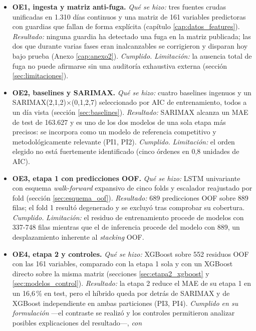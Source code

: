 \begin{itemize}
  \item \textbf{OE1, ingesta y matriz anti-fuga.} \emph{Qué se hizo:} tres fuentes crudas
    unificadas en 1.310 días continuos y una matriz de 161 variables predictoras con
    guardias que fallan de forma explícita (capítulo \ref{cap:datos_features}).
    \emph{Resultado:} ninguna guardia ha detectado una fuga en la matriz publicada; las
    dos que durante varias fases eran inalcanzables se corrigieron y disparan hoy bajo
    prueba (Anexo \ref{cap:anexo2}). \emph{Cumplido.} \emph{Limitación:} la ausencia
    total de fuga no puede afirmarse sin una auditoría exhaustiva externa (sección
    \ref{sec:limitaciones}).
  \item \textbf{OE2, baselines y SARIMAX.} \emph{Qué se hizo:} cuatro baselines ingenuos y
    un SARIMAX(2,1,2)$\times$(0,1,2,7) seleccionado por AIC de entrenamiento, todos a un
    día vista (sección \ref{sec:baselines}). \emph{Resultado:} SARIMAX alcanza un MAE de
    test de 163.627 y es uno de los dos modelos de una sola etapa más precisos: se
    incorpora como un modelo de referencia competitivo y metodológicamente relevante
    (PI1, PI2). \emph{Cumplido.} \emph{Limitación:}
    el orden elegido no está fuertemente identificado (cinco órdenes en 0,8 unidades de
    AIC).
  \item \textbf{OE3, etapa 1 con predicciones OOF.} \emph{Qué se hizo:} LSTM univariante
    con esquema \emph{walk-forward} expansivo de cinco folds y escalador reajustado por fold
    (sección \ref{sec:esquema_oof}). \emph{Resultado:} 689 predicciones OOF sobre 889 filas;
    el fold 1 resultó degenerado y se excluyó tras comprobar su cobertura.
    \emph{Cumplido.} \emph{Limitación:} el residuo de entrenamiento procede de modelos con
    337-748 filas mientras que el de inferencia procede del modelo con 889, un
    desplazamiento inherente al \emph{stacking} OOF.
  \item \textbf{OE4, etapa 2 y controles.} \emph{Qué se hizo:} XGBoost sobre 552 residuos
    OOF con las 161 variables, comparado con la etapa 1 sola y con un XGBoost directo sobre
    la misma matriz (secciones \ref{sec:etapa2_xgboost} y \ref{sec:modelos_control}).
    \emph{Resultado:} la etapa 2 reduce el MAE de su etapa 1 en un 16,6\,\% en test, pero
    el híbrido queda por detrás de SARIMAX y de XGBoost independiente en ambas
    particiones (PI3, PI4). \emph{Cumplido en su formulación} —el contraste se realizó y
    los controles permitieron analizar posibles explicaciones del resultado—, \emph{con
}
\end{itemize}
